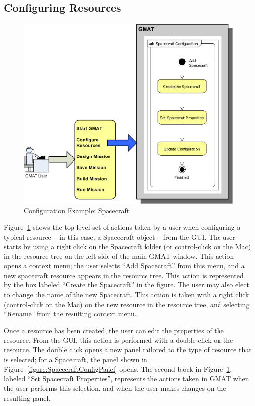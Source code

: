 \subsection{Configuring Resources}

\begin{figure}[htb]
\begin{center}
\includegraphics[301,260]{Images/GMAT_ConfigureResource.png}
\caption{\label{figure:ResourceConfig}Configuration Example: Spacecraft}
\end{center}
\end{figure}

Figure~\ref{figure:ResourceConfig} shows the top level set of actions taken by a user when
configuring a typical resource -- in this case, a Spacecraft object -- from the GUI.  The user
starts by using a right click on the Spacecraft folder (or control-click on the Mac) in the
resource tree on the left side of the main GMAT window.  This action opens a context menu; the user
selects ``Add Spacecraft'' from this menu, and a new spacecraft resource appears in the resource
tree.  This action is represented by the box labeled ``Create the Spacecraft'' in the figure.  The
user may also elect to change the name of the new Spacecraft.  This action is taken with a right
click (control-click on the Mac) on the new resource in the resource tree, and selecting
``Rename'' from the resulting context menu.

Once a resource has been created, the user can edit the properties of the resource.  From the GUI,
this action is performed with a double click on the resource.  The double click opens a new panel
tailored to the type of resource that is selected; for a Spacecraft, the panel shown in
Figure~\ref{figure:SpacecraftConfigPanel} opens.  The second block in
Figure~\ref{figure:ResourceConfig}, labeled ``Set Spacecraft Properties'', represents the actions
taken in GMAT when the user performs this selection, and when the user makes changes on the
resulting panel.


